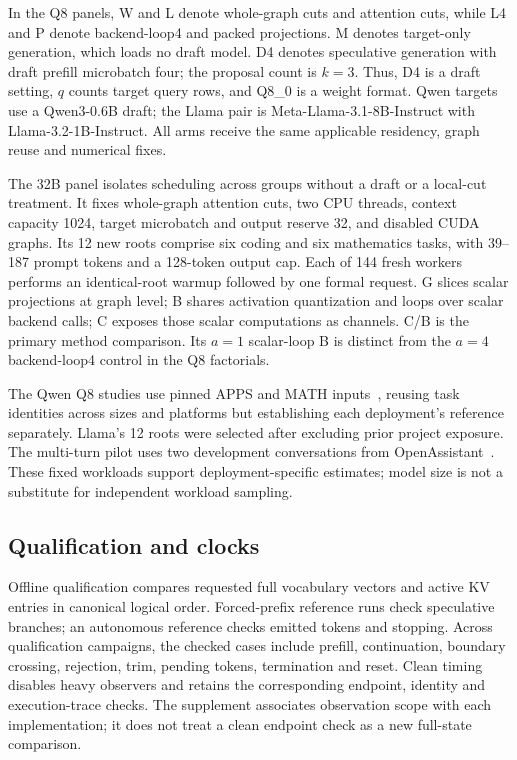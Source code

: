 In the Q8 panels, W and L denote \Simple{} whole-graph cuts and \Local{} attention cuts, while L4 and P denote backend-loop4 and packed projections. M denotes target-only generation, which loads no draft model. D4 denotes speculative generation with draft prefill microbatch four; the proposal count is $k=3$. Thus, D4 is a draft setting, $q$ counts target query rows, and Q8\_0 is a weight format. Qwen targets use a Qwen3-0.6B draft; the Llama pair is Meta-Llama-3.1-8B-Instruct with Llama-3.2-1B-Instruct. All arms receive the same applicable residency, graph reuse and numerical fixes.

The 32B panel isolates scheduling across groups without a draft or a local-cut treatment. It fixes whole-graph attention cuts, two CPU threads, context capacity 1024, target microbatch and output reserve 32, and disabled CUDA graphs. Its 12 new roots comprise six coding and six mathematics tasks, with 39--187 prompt tokens and a 128-token output cap. Each of 144 fresh workers performs an identical-root warmup followed by one formal request. G slices scalar projections at graph level; B shares activation quantization and loops over scalar backend calls; C exposes those scalar computations as channels. C/B is the primary method comparison. Its $a=1$ scalar-loop B is distinct from the $a=4$ backend-loop4 control in the Q8 factorials.

The Qwen Q8 studies use pinned APPS and MATH inputs~\cite{apps,math}, reusing task identities across sizes and platforms but establishing each deployment's reference separately. Llama's 12 roots were selected after excluding prior project exposure. The multi-turn pilot uses two development conversations from OpenAssistant~\cite{oasst}. These fixed workloads support deployment-specific estimates; model size is not a substitute for independent workload sampling.

\subsection{Qualification and clocks}
Offline qualification compares requested full vocabulary vectors and active KV entries in canonical logical order. Forced-prefix reference runs check speculative branches; an autonomous reference checks emitted tokens and stopping. Across qualification campaigns, the checked cases include prefill, continuation, boundary crossing, rejection, trim, pending tokens, termination and reset. Clean timing disables heavy observers and retains the corresponding endpoint, identity and execution-trace checks. The supplement associates observation scope with each implementation; it does not treat a clean endpoint check as a new full-state comparison.

